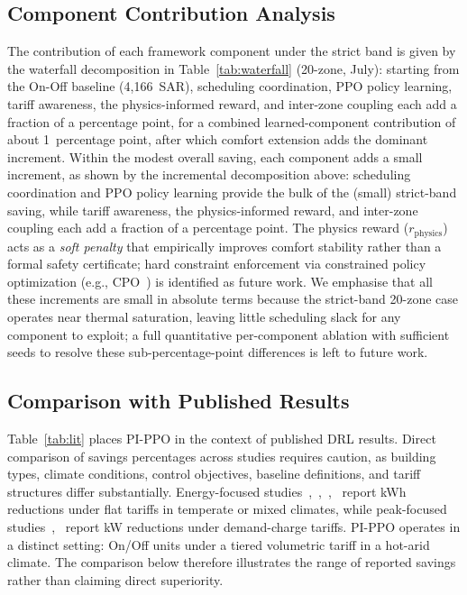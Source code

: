 \documentclass[12pt,a4paper]{article}
\begin{document}
\subsection{Component Contribution Analysis}

The contribution of each framework component under the strict band is given by the waterfall decomposition in Table~\ref{tab:waterfall} (20-zone, July): starting from the On-Off baseline (4{,}166~SAR), scheduling coordination, PPO policy learning, tariff awareness, the physics-informed reward, and inter-zone coupling each add a fraction of a percentage point, for a combined learned-component contribution of about 1~percentage point, after which comfort extension adds the dominant increment. Within the modest overall saving, each component adds a small increment, as shown by the incremental decomposition above: scheduling coordination and PPO policy learning provide the bulk of the (small) strict-band saving, while tariff awareness, the physics-informed reward, and inter-zone coupling each add a fraction of a percentage point. The physics reward ($r_{\text{physics}}$) acts as a \textit{soft penalty} that empirically improves comfort stability rather than a formal safety certificate; hard constraint enforcement via constrained policy optimization (e.g., CPO~\cite{ref37}) is identified as future work. We emphasise that all these increments are small in absolute terms because the strict-band 20-zone case operates near thermal saturation, leaving little scheduling slack for any component to exploit; a full quantitative per-component ablation with sufficient seeds to resolve these sub-percentage-point differences is left to future work.

\subsection{Comparison with Published Results}

Table~\ref{tab:lit} places PI-PPO in the context of published DRL results. Direct comparison of savings percentages across studies requires caution, as building types, climate conditions, control objectives, baseline definitions, and tariff structures differ substantially. Energy-focused studies~\cite{ref7},~\cite{ref8},~\cite{ref9},~\cite{ref20} report kWh reductions under flat tariffs in temperate or mixed climates, while peak-focused studies~\cite{ref10},~\cite{ref11} report kW reductions under demand-charge tariffs. PI-PPO operates in a distinct setting: On/Off units under a tiered volumetric tariff in a hot-arid climate. The comparison below therefore illustrates the range of reported savings rather than claiming direct superiority.
\end{document}
